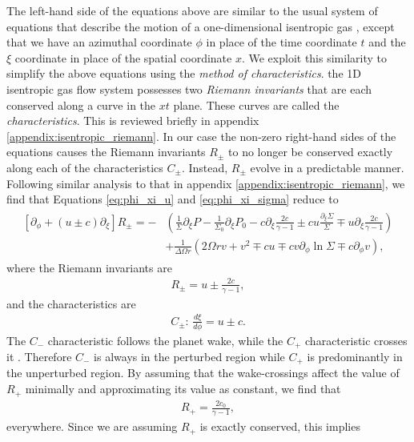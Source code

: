 The left-hand side of the equations above are similar to the usual system of equations that describe the motion of a one-dimensional isentropic gas \citep{landau1987}, except that we have an azimuthal coordinate $\phi$ in place of the time coordinate $t$ and the $\xi$ coordinate in place of the spatial coordinate $x$.
We exploit this similarity to simplify the above equations using the \textit{method of characteristics}.
the 1D isentropic gas flow system possesses two \textit{Riemann invariants} that are each conserved along a curve in the $xt$ plane.
These curves are called the \textit{characteristics}.
This is reviewed briefly in appendix \ref{appendix:isentropic_riemann}.
In our case the non-zero right-hand sides of the equations causes the Riemann invariants $R_\pm$ to no longer be conserved exactly along each of the characteristics $C_\pm$.
Instead, $R_\pm$ evolve in a predictable manner.
Following similar analysis to that in appendix \ref{appendix:isentropic_riemann}, we find that Equations \eqref{eq:phi_xi_u} and \eqref{eq:phi_xi_sigma} reduce to 
\begin{align}
    \begin{split}
        \left[ \partial_\phi + (u \pm c) \partial_\xi \right] R_\pm = - &\left( \frac{1}{\Sigma} \partial_\xi P - \frac{1}{\Sigma_0} \partial_\xi P_0 - c\partial_\xi \frac{2c}{\gamma-1} \pm cu \frac{\partial_\xi \Sigma}{\Sigma} \mp u \partial_\xi \frac{2c}{\gamma-1} \right) \\
        &+ \frac{1}{\Delta \Omega r} \left( 2\Omega r v + v^2 \mp cu \mp cv \partial_\phi \ln \Sigma \mp c \partial_\phi v \right),
    \end{split}
\end{align}
where the Riemann invariants are
\begin{align}
    R_\pm = u \pm \frac{2c}{\gamma-1},
\end{align}
and the characteristics are
\begin{align}
    C_\pm : \, \frac{d\xi}{d\phi} = u \pm c.
\end{align}
The $C_-$ characteristic follows the planet wake, while the $C_+$ characteristic crosses it \citep{goodman2001}.
Therefore $C_-$ is always in the perturbed region while $C_+$ is predominantly in the unperturbed region.
By assuming that the wake-crossings affect the value of $R_+$ minimally and approximating its value as constant, we find that
\begin{align}
    R_+ = \frac{2 c_0}{\gamma - 1},
\end{align}
everywhere.
Since we are assuming $R_+$ is exactly conserved, this implies
